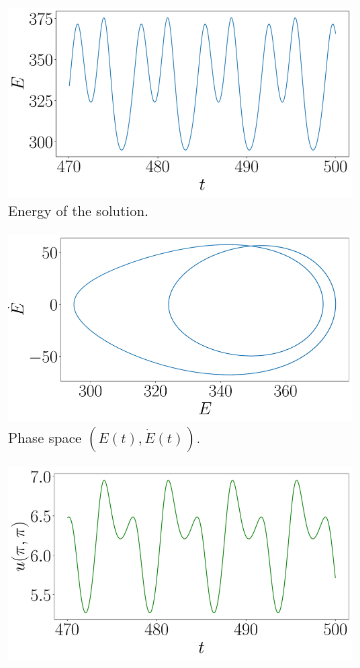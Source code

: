 \documentclass[twoside]{article}
\begin{document}
\begin{figure}
  \centering
  \begin{subfigure}[ht]{0.32\textwidth}
    \includegraphics[width=\textwidth]{images/tp_energy.pdf}
    \caption{Energy of the solution.}
  \end{subfigure}\hfill
  \begin{subfigure}[ht]{0.32\textwidth}
    \includegraphics[width=\textwidth]{images/tp_energy_phase.pdf}
    \caption{Phase space $(E(t), \dot{E}(t))$.}
    \label{fig:tp_energy_phase}
  \end{subfigure}\hfill
  \begin{subfigure}[ht]{0.32\textwidth}
    \includegraphics[width=\textwidth]{images/tp_u_pi_pi.pdf}

\end{subfigure}
\end{figure}
\end{document}
